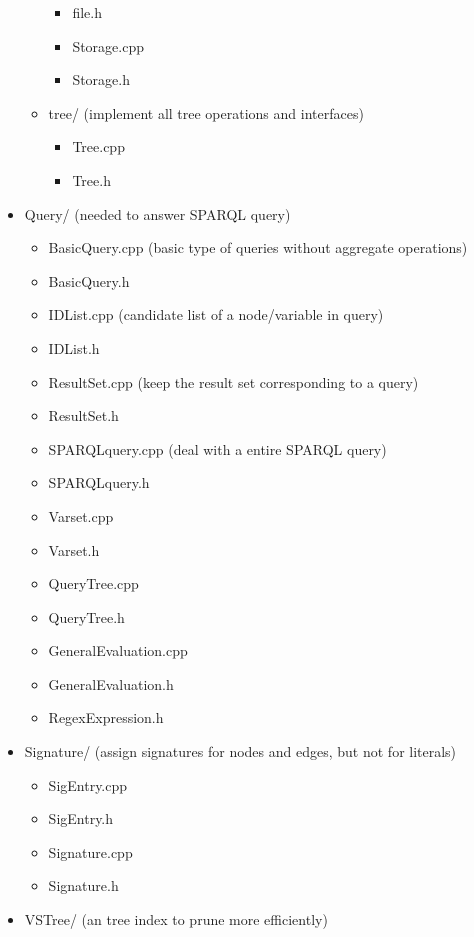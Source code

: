 \documentclass[titlepage, a4paper, 12pt]{article}
\begin{document}
\begin{itemize}
\begin{itemize}
    \begin{itemize}
    \item
      file.h
    \item
      Storage.cpp
    \item
      Storage.h
    \end{itemize}
  \item
    tree/ (implement all tree operations and interfaces)

    \begin{itemize}
    \item
      Tree.cpp
    \item
      Tree.h
    \end{itemize}
  \end{itemize}
\item
  Query/ (needed to answer SPARQL query)

  \begin{itemize}
  \item
    BasicQuery.cpp (basic type of queries without aggregate operations)
  \item
    BasicQuery.h
  \item
    IDList.cpp (candidate list of a node/variable in query)
  \item
    IDList.h
  \item
    ResultSet.cpp (keep the result set corresponding to a query)
  \item
    ResultSet.h
  \item
    SPARQLquery.cpp (deal with a entire SPARQL query)
  \item
    SPARQLquery.h
  \item
    Varset.cpp
  \item
    Varset.h
  \item
    QueryTree.cpp
  \item
    QueryTree.h
  \item
    GeneralEvaluation.cpp
  \item
    GeneralEvaluation.h
  \item
    RegexExpression.h
  \end{itemize}
\item
  Signature/ (assign signatures for nodes and edges, but not for
  literals)

  \begin{itemize}
  \item
    SigEntry.cpp
  \item
    SigEntry.h
  \item
    Signature.cpp
  \item
    Signature.h
  \end{itemize}
\item
  VSTree/ (an tree index to prune more efficiently)


\end{itemize}
\end{document}
